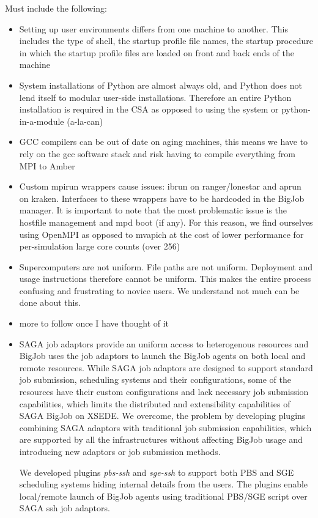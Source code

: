 \documentclass{sig-alternate}
\begin{document}
Must include the following:
\begin{itemize}
 \item Setting up user environments differs from one machine to another. This
includes the type of shell, the startup profile file names, the startup
procedure in which the startup profile files are loaded on front and back ends
of the machine
 \item System installations of Python are almost always old, and Python does not
lend itself to modular user-side installations. Therefore an entire Python
installation is required in the CSA as opposed to using the system or
python-in-a-module (a-la-can)
 \item GCC compilers can be out of date on aging machines, this means we have
to rely on the gcc software stack and risk having to compile everything from MPI
to Amber
 \item Custom mpirun wrappers cause issues: ibrun on ranger/lonestar and aprun
on kraken. Interfaces to these wrappers have to be hardcoded in the BigJob
manager. It is important to note that the most problematic issue is the hostfile
management and mpd boot (if any). For this reason, we find ourselves using
OpenMPI as opposed to mvapich at the cost of lower performance for
per-simulation large core counts (over 256)
 \item Supercomputers are not uniform. File paths are not uniform. Deployment
and usage instructions therefore cannot be uniform. This makes the entire
process confusing and frustrating to novice users. We understand not much can
be done about this.
 \item more to follow once I have thought of it

\item SAGA job adaptors provide an uniform access to heterogenous resources and BigJob uses the job adaptors 
to launch the BigJob agents on both local and remote resources. While SAGA job adaptors are designed to support 
standard job submission, scheduling systems and their configurations, some of the resources have their custom 
configurations and lack necessary job submission capabilities, which limits the distributed and extensibility capabilities 
of SAGA BigJob on XSEDE. We overcome, the problem by developing plugins combining SAGA adaptors with traditional 
job submission capabilities, which are supported by all the infrastructures without affecting BigJob usage and introducing 
new adaptors or job submission methods. 

We developed plugins \textit{pbs-ssh} and \textit{sge-ssh} to support both PBS and SGE scheduling systems hiding internal details
from the users. The plugins enable local/remote launch of BigJob agents using traditional PBS/SGE script over SAGA ssh job adaptors. 
\end{itemize}
\end{document}
